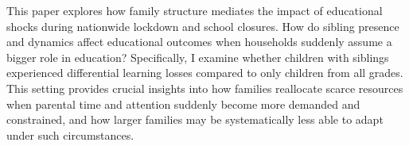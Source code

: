 
This paper explores how family structure mediates the impact of educational shocks during nationwide lockdown and school closures. How do sibling presence and dynamics affect educational outcomes when households suddenly assume a bigger role in education? Specifically, I examine whether children with siblings experienced differential learning losses compared to only children from all grades. This setting provides crucial insights into how families reallocate scarce resources when parental time and attention suddenly become more demanded and constrained, and how larger families may be systematically less able to adapt under such circumstances.



